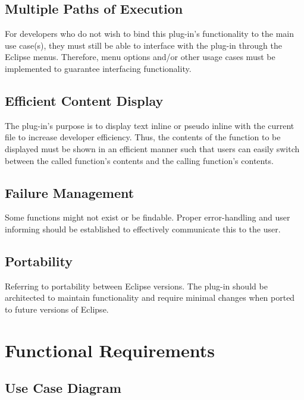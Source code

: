 \documentclass[]{report}
\begin{document}
	\section{Multiple Paths of Execution}
	
		For developers who do not wish to bind this plug-in's functionality to the main use case(s), they must still be able to interface with the plug-in through the Eclipse menus.  Therefore, menu options and/or other usage cases must be implemented to guarantee interfacing functionality.
	
	\section{Efficient Content Display}
	
		The plug-in's purpose is to display text inline or pseudo inline with the current file to increase developer efficiency.  Thus, the contents of the function to be displayed must be shown in an efficient manner such that users can easily switch between the called function's contents and the calling function's contents.
	
	\section{Failure Management}
	
		Some functions might not exist or be findable.  Proper error-handling and user informing should be established to effectively communicate this to the user.
	
	\section{Portability}
	
		Referring to portability between Eclipse versions.  The plug-in should be architected to maintain functionality and require minimal changes when ported to future versions of Eclipse.
	
\chapter{Functional Requirements}
	
	\section{Use Case Diagram}
	
\end{document}
